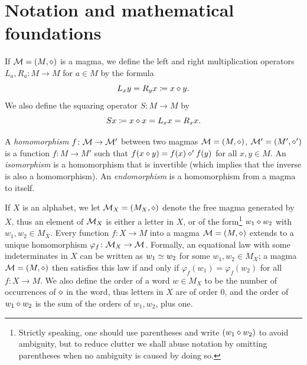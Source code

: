 \section{Notation and mathematical foundations}\label{notation-sec}

If ${\mathcal{M}} = (M,\diamond)$ is a magma, we define the left and right multiplication operators $L_a, R_a \colon M \to M$ for $a \in M$ by the formula
\begin{equation}\label{left-right}
    L_x y = R_y x \coloneqq x \diamond y.
\end{equation}
We also define the squaring operator $S \colon M \to M$ by
\begin{equation}\label{square-def}
    Sx \coloneqq x \diamond x = L_x x = R_x x.
\end{equation}

A \emph{homomorphism} $f \colon {\mathcal{M}} \to {\mathcal{M}}'$ between two magmas ${\mathcal{M}} = (M,\diamond)$, ${\mathcal{M}}' = (M',\diamond')$ is a function $f \colon M \to M'$ such that $f(x \diamond y) = f(x) \diamond' f(y)$ for all $x,y \in M$.  An \emph{isomorphism} is a homomorphism that is invertible (which implies that the inverse is also a homomorphism).  An \emph{endomorphism} is a homomorphism from a magma to itself.

If $X$ is an alphabet, we let ${\mathcal{M}}_X = (M_X, \diamond)$ denote the free magma generated by $X$, thus an element of ${\mathcal{M}}_X$ is either a letter in $X$, or of the form\footnote{Strictly speaking, one should use parentheses and write $(w_1 \diamond w_2)$ to avoid ambiguity, but to reduce clutter we shall abuse notation by omitting parentheses when no ambiguity is caused by doing so.} $w_1 \diamond w_2$ with $w_1,w_2 \in M_X$.  Every function $f \colon X \to M$ into a magma ${\mathcal{M}} = (M,\diamond)$ extends to a unique homomorphism $\varphi_f \colon {\mathcal{M}}_X \to {\mathcal{M}}$.  Formally, an equational law with some indeterminates in $X$ can be written as $w_1 \simeq w_2$ for some $w_1, w_2 \in M_X$; a magma ${\mathcal{M}} = (M,\diamond)$ then satisfies this law if and only if $\varphi_f(w_1) = \varphi_f(w_2)$ for all $f \colon X \to M$.  We also define the order of a word $w \in M_X$ to be the number of occurrences of $\diamond$ in the word, thus letters in $X$ are of order $0$, and the order of $w_1 \diamond w_2$ is the sum of the orders of $w_1, w_2$, plus one.

